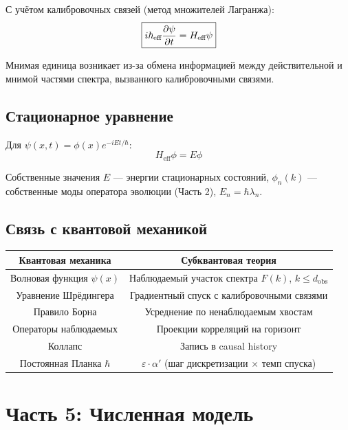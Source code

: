 \documentclass[11pt,a4paper]{article}
\theoremstyle{definition}
\begin{document}
С учётом калибровочных связей (метод множителей Лагранжа):
\begin{equation}
    \boxed{i \hbar_{\text{eff}} \pdv{\psi}{t} = H_{\text{eff}} \psi}
\end{equation}

Мнимая единица возникает из-за обмена информацией между действительной и мнимой частями спектра, вызванного калибровочными связями.

\subsection{Стационарное уравнение}

Для $\psi(x, t) = \phi(x) e^{-iEt/\hbar}$:
\begin{equation}
    H_{\text{eff}} \phi = E \phi
\end{equation}

Собственные значения $E$ --- энергии стационарных состояний, $\phi_n(k)$ --- собственные моды оператора эволюции (Часть 2), $E_n = \hbar \lambda_n$.

\subsection{Связь с квантовой механикой}

\begin{center}
\begin{tabular}{c|c}
\textbf{Квантовая механика} & \textbf{Субквантовая теория} \\
\hline
Волновая функция $\psi(x)$ & Наблюдаемый участок спектра $F(k)$, $k \leq d_{\text{obs}}$ \\
Уравнение Шрёдингера & Градиентный спуск с калибровочными связями \\
Правило Борна & Усреднение по ненаблюдаемым хвостам \\
Операторы наблюдаемых & Проекции корреляций на горизонт \\
Коллапс & Запись в causal history \\
Постоянная Планка $\hbar$ & $\varepsilon \cdot \alpha'$ (шаг дискретизации $\times$ темп спуска)
\end{tabular}
\end{center}

\newpage
\section{Часть 5: Численная модель}
\end{document}
